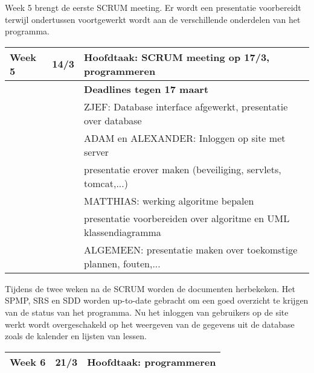 \documentclass{article}
\begin{document}
Week 5 brengt de eerste SCRUM meeting. Er wordt een presentatie voorbereidt terwijl ondertussen voortgewerkt wordt aan de verschillende onderdelen van het programma. 
 
\begin{center}
	
\begin{tabular}[t]{|p{1.3cm}|p{0.8cm}|p{9cm}|}
\hline
Week 5	& 14/3 & \textbf{	Hoofdtaak:} SCRUM meeting op 17/3, programmeren\\
\hline
 & & \textbf{Deadlines tegen 17 maart} \\
 & & ZJEF: Database interface afgewerkt, presentatie over database \\
 & & ADAM en ALEXANDER:  Inloggen op site met server \\
 & & presentatie erover maken (beveiliging, servlets, tomcat,...) \\
 & & MATTHIAS: werking algoritme bepalen \\
 & & presentatie voorbereiden over algoritme en UML klassendiagramma \\
 & & ALGEMEEN: presentatie maken over toekomstige plannen, fouten,... \\
 \hline
 \end{tabular}
\end{center}
 
Tijdens de twee weken na de SCRUM worden de documenten herbekeken. Het SPMP, SRS en SDD worden up-to-date gebracht om een goed overzicht te krijgen van de status van het programma. Nu het inloggen van gebruikers op de site werkt wordt overgeschakeld op het weergeven van de gegevens uit de database zoals de kalender en lijsten van lessen.
\begin{center}
\begin{tabular}[t]{|p{1.3cm}|p{0.8cm}|p{9cm}|}
 \hline
Week 6	& 21/3 &	\textbf{Hoofdtaak:} programmeren \\
\hline
\end{tabular}
\end{center}
\end{document}
